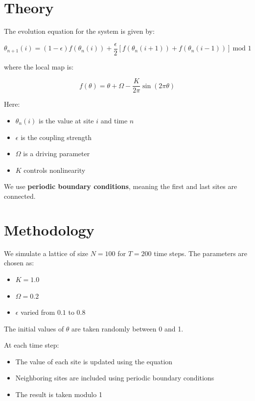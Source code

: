 \documentclass[12pt]{article}
\begin{document}
\section{Theory}

The evolution equation for the system is given by:

\begin{equation}
\theta_{n+1}(i) = (1 - \epsilon) f(\theta_n(i)) + \frac{\epsilon}{2} \left[ f(\theta_n(i+1)) + f(\theta_n(i-1)) \right] \ \text{mod } 1
\end{equation}

where the local map is:

\begin{equation}
f(\theta) = \theta + \Omega - \frac{K}{2\pi} \sin(2\pi \theta)
\end{equation}

Here:
\begin{itemize}
    \item $\theta_n(i)$ is the value at site $i$ and time $n$
    \item $\epsilon$ is the coupling strength
    \item $\Omega$ is a driving parameter
    \item $K$ controls nonlinearity
\end{itemize}

We use \textbf{periodic boundary conditions}, meaning the first and last sites are connected.

\section{Methodology}

We simulate a lattice of size $N = 100$ for $T = 200$ time steps. The parameters are chosen as:

\begin{itemize}
    \item $K = 1.0$
    \item $\Omega = 0.2$
    \item $\epsilon$ varied from $0.1$ to $0.8$
\end{itemize}

The initial values of $\theta$ are taken randomly between 0 and 1.

At each time step:
\begin{itemize}
    \item The value of each site is updated using the equation
    \item Neighboring sites are included using periodic boundary conditions
    \item The result is taken modulo 1
\end{itemize}
\end{document}

